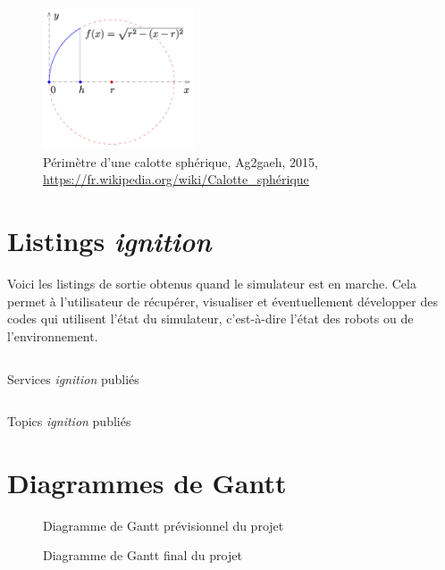 		\begin{figure}[H]
			\centering
			\includegraphics[width=0.4\textwidth]{imgs/calotte_spherique.png}
			\caption{Périmètre d'une calotte sphérique, Ag2gaeh, 2015, \url{https://fr.wikipedia.org/wiki/Calotte_sphérique}}
			\label{fig:calotte_spherique}
		\end{figure}

	\section{Listings \textit{ignition}}

		Voici les listings de sortie obtenus quand le simulateur est en marche. Cela permet à l'utilisateur de récupérer, visualiser et éventuellement développer des codes qui utilisent l'état du simulateur, c'est-à-dire l'état des robots ou de l'environnement.

		\begin{listing}[!htb]
			\inputminted{shell}{./listings/ign_services.log}
			\caption{Services \textit{ignition} publiés}
			\label{listing:ign_services}
		\end{listing}

		\begin{listing}[!htb]
			\inputminted{shell}{./listings/ign_topics.log}
			\caption{Topics \textit{ignition} publiés}
			\label{listing:ign_topics}
		\end{listing}

	\clearpage

	\section{Diagrammes de Gantt}

	\begin{figure}[H]
		\centering
        \label{fig:gantt_before}
        \caption{Diagramme de Gantt prévisionnel du projet}
	\end{figure}

	\begin{figure}[H]
		\centering
        \label{fig:gantt_after}
        \caption{Diagramme de Gantt final du projet}
	\end{figure}